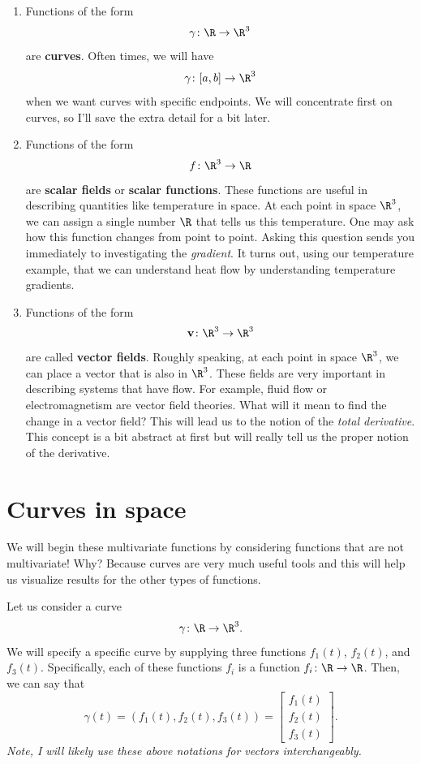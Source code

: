         
        \begin{enumerate}[(1)]
        \item Functions of the form
        \[
        \gamma \colon \R\to \R^3
        \]
        are \textbf{curves}.  Often times, we will have 
        \[
        \gamma \colon [a,b]\to \R^3
        \]
        when we want curves with specific endpoints. We will concentrate first on curves, so I'll save the extra detail for a bit later.
        
        \item Functions of the form
        \[
        f\colon \R^3 \to \R
        \]
        are \textbf{scalar fields} or \textbf{scalar functions}.   These functions are useful in describing quantities like temperature in space.  At each point in space $\R^3$, we can assign a single number $\R$ that tells us this temperature.  One may ask how this function changes from point to point.  Asking this question sends you immediately to investigating the \emph{gradient}.  It turns out, using our temperature example, that we can understand heat flow by understanding temperature gradients.
        
        \item Functions of the form
        \[
        \mathbf{v}\colon \R^3 \to \R^3
        \]
        are called \textbf{vector fields}.  Roughly speaking, at each point in space $\R^3$, we can place a vector that is also in $\R^3$.  These fields are very important in describing systems that have flow.  For example, fluid flow or electromagnetism are vector field theories.  What will it mean to find the change in a vector field?  This will lead us to the notion of the \emph{total derivative}.  This concept is a bit abstract at first but will really tell us the proper notion of the derivative.
        \end{enumerate}
        
        \section{Curves in space}
        
        We will begin these multivariate functions by considering functions that are not multivariate!  Why? Because curves are very much useful tools and this will help us visualize results for the other types of functions.
        
        Let us consider a curve
        \[
        \gamma \colon \R \to \R^3.
        \]
        We will specify a specific curve by supplying three functions $f_1(t)$, $f_2(t)$, and $f_3(t)$. Specifically, each of these functions $f_i$ is a function $f_i\colon \R \to \R$. Then, we can say that
        \[
        \gamma(t)=(f_1(t),f_2(t),f_3(t))=\begin{bmatrix} f_1(t)\\ f_2(t)\\ f_3(t)\end{bmatrix}.
        \]
        \emph{Note, I will likely use these above notations for vectors interchangeably.} 
        
